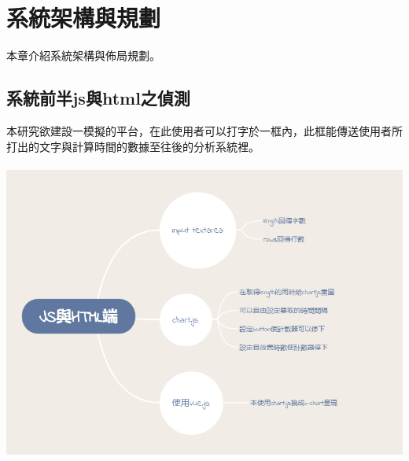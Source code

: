 \chapter{系統架構與規劃}
\label{c:intro}
本章介紹系統架構與佈局規劃。

\section{系統前半js與html之偵測} 
本研究欲建設一模擬的平台，在此使用者可以打字於一框內，此框能傳送使用者所打出的文字與計算時間的數據至往後的分析系統裡。\\\\
\includegraphics[width = .8\textwidth]{c5C4T4t.png}